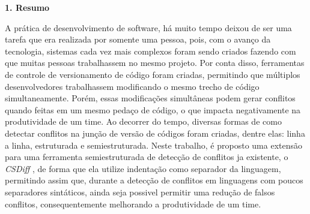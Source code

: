 \begin{flushleft}
	{\textbf{\Large{1. Resumo}}}
\end{flushleft}
\vspace{1cm}

A prática de desenvolvimento de software, há muito tempo deixou de ser uma tarefa que era realizada por somente uma pessoa, pois, com o avanço da tecnologia, sistemas cada
vez mais complexos foram sendo criados fazendo com que muitas pessoas trabalhassem no mesmo projeto. Por conta disso, ferramentas de controle de versionamento de código foram criadas, permitindo que múltiplos desenvolvedores trabalhassem modificando o mesmo trecho de código simultaneamente. Porém, essas modificações simultâneas podem gerar conflitos quando feitas em um mesmo pedaço de código, o que impacta negativamente na produtividade de um time. Ao decorrer do tempo, diversas formas de como detectar conflitos na junção de versão de códigos foram criadas, dentre elas: linha a linha, estruturada e semiestruturada. Neste trabalho, é proposto uma extensão para uma ferramenta semiestruturada de detecção de conflitos ja existente, o \emph{CSDiff} \cite{clementino2021textual}, de forma que ela utilize indentação como separador da linguagem, permitindo assim que, durante a detecção de conflitos em linguagens com poucos separadores sintáticos, ainda seja possivel permitir uma redução de falsos conflitos, consequentemente melhorando a produtividade de um time.
